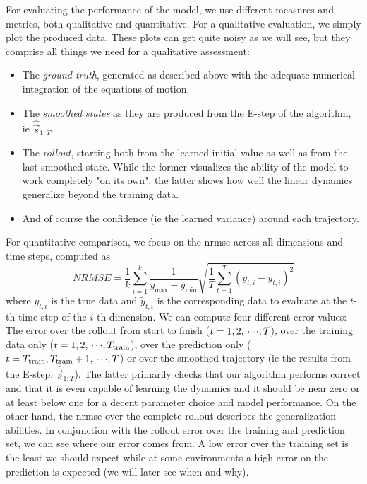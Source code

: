 	For evaluating the performance of the model, we use different measures and metrics, both qualitative and quantitative. For a qualitative evaluation, we simply plot the produced data. These plots can get quite noisy as we will see, but they comprise all things we need for a qualitative assessment:
	\begin{itemize}
		\item The \emph{ground truth}, generated as described above with the adequate numerical integration of the equations of motion.
		\item The \emph{smoothed states} as they are produced from the E-step of the \algname algorithm, \ac{ie} \(\hat{\vec{s}}_{1:T}\).
		\item The \emph{rollout}, starting both from the learned initial value as well as from the last smoothed state. While the former visualizes the ability of the model to work completely "on its own", the latter shows how well the linear dynamics generalize beyond the training data.
		\item And of course the confidence (\ac{ie} the learned variance) around each trajectory.
	\end{itemize}
	For quantitative comparison, we focus on the \ac{nrmse} across all dimensions and time steps, computed as
	\begin{equation*}
		\mathit{NRMSE} = \frac{1}{k} \sum_{i = 1}^{k} \frac{1}{y_\mathrm{max} - y_\mathrm{min}} \sqrt{ \frac{1}{T} \sum_{t = 1}^{T} (y_{t, i} - \tilde{y}_{t, i})^2 }
	\end{equation*}
	where \( y_{t, i} \) is the true data and \( \tilde{y}_{t, i} \) is the corresponding data to evaluate at the \(t\)-th time step of the \(i\)-th dimension. We can compute four different error values: The error over the rollout from start to finish (\( t = 1, 2, \,\cdots\!, T \)), over the training data only (\( t = 1, 2, \,\cdots\!, T_{\mathrm{train}} \)), over the prediction only (\( t = T_{\mathrm{train}}, T_{\mathrm{train}} + 1, \,\cdots\!, T \)) or over the smoothed trajectory (\ac{ie} the results from the E-step, \(  \hat{\vec{s}}_{1:T} \)). The latter primarily checks that our algorithm performs correct and that it is even capable of learning the dynamics and it should be near zero or at least below one for a decent parameter choice and model performance. On the other hand, the \ac{nrmse} over the complete rollout describes the generalization abilities. In conjunction with the rollout error over the training and prediction set, we can see where our error comes from. A low error over the training set is the least we should expect while at some environments a high error on the prediction is expected (we will later see when and why).

